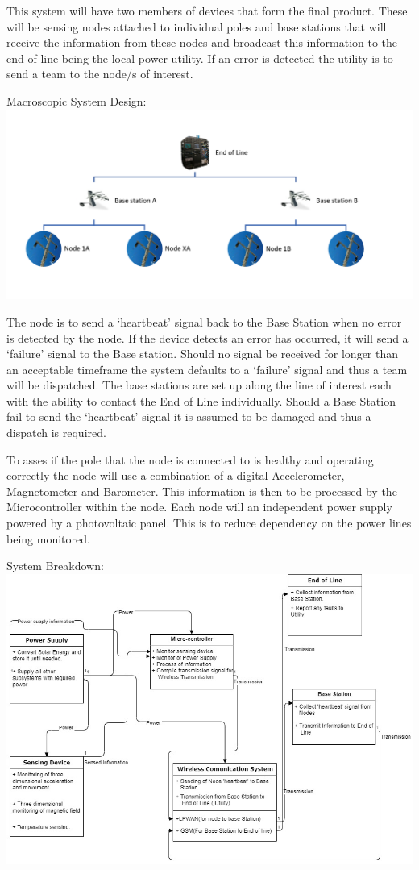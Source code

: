 \documentclass[12pt]{article}
\begin{document}
This system will have two members of devices that form the final product. These will be sensing nodes attached
to individual poles and base stations that will receive the information from these nodes and broadcast this
information to the end of line being the local power utility. If an error is detected the utility is to send
a team to the node/s of interest.

Macroscopic System Design:\\
\includegraphics[scale = 1]{Macroscopic_system_breakdown}

The node is to send a ‘heartbeat’ signal back to the Base Station when no error is detected by the node. 
If the device detects an error has occurred, it will send a ‘failure’ signal to the Base station. Should 
no signal be received for longer than an acceptable timeframe the system defaults to a ‘failure’ signal 
and thus a team will be dispatched. The base stations are set up along the line of interest each  with  
the ability to contact the End of Line individually. Should a Base Station fail to send the ‘heartbeat’ 
signal it is assumed to be damaged and thus a dispatch is required.

To asses if the pole that the node is connected to is healthy and operating correctly the node will use 
a combination of a digital Accelerometer, Magnetometer and Barometer. This information is then to be 
processed by the Microcontroller within the node. Each node will an independent power supply powered by 
a photovoltaic panel.  This is to reduce dependency on the power lines being monitored.

System Breakdown: \\
\includegraphics[scale = 0.6]{System_Design.jpg}
\end{document}
